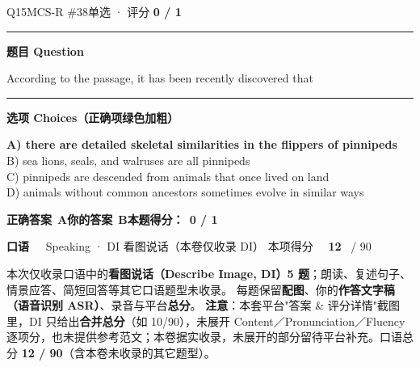 \documentclass[11pt]{article}
\newcommand{\ptesub}[1]{%
  \par\needspace{2\baselineskip}\smallskip
  {\color{cAccent}\rule[-0.2ex]{3pt}{1.05em}}\hspace{6pt}%
  {\bfseries\color{cHead}#1}\par\nopagebreak\smallskip}
\newcommand{\ptesection}[3]{%
  \addcontentsline{toc}{section}{#1}%
  \needspace{6\baselineskip}
  \begin{tcolorbox}[enhanced, colback=cAccent, colframe=cAccent, sharp corners,
     left=14pt, right=14pt, top=10pt, bottom=10pt, boxrule=0pt]
    {\fontsize{20}{24}\selectfont\bfseries\color{white} #1\ \ }%
    {\large\color{white!85} #2}\hfill
    {\large\color{white}本项得分\ \ }{\fontsize{22}{24}\selectfont\bfseries\color{white} #3}%
    \ {\color{white!85}/ 90}
  \end{tcolorbox}}
\begin{document}
\begin{qblock}{Q15\quad MCS-R \#38}{单选 · 评分 \textcolor{cAccent}{\bfseries 0 / 1}}
\ptesub{题目 Question}
\begin{notebox}According to the passage, it has been recently discovered that\end{notebox}
\ptesub{选项 Choices（正确项绿色加粗）}
{\small
{\color{cFix}\textbf{A) there are detailed skeletal similarities in the flippers of pinnipeds}}\\
B) sea lions, seals, and walruses are all pinnipeds\\
C) pinnipeds are descended from animals that once lived on land\\
D) animals without common ancestors sometimes evolve in similar ways}
\par\smallskip
\textbf{正确答案}\ \textcolor{cFix}{\bfseries A}\qquad\textbf{你的答案}\ {\color{cWrong}\bfseries B}\qquad\textbf{本题得分：}\ {\color{cAccent}\bfseries 0 / 1}
\end{qblock}

\clearpage
\ptesection{口语}{Speaking · DI 看图说话（本卷仅收录 DI）}{12}

\vspace{1mm}
{\small\color{gray} 本次仅收录口语中的\textbf{看图说话（Describe Image, DI）5 题}；朗读、复述句子、情景应答、简短回答等其它口语题型未收录。
每题保留\textbf{配图}、你的\textbf{作答文字稿（语音识别 ASR）}、录音与平台\textbf{总分}。
\textbf{注意}：本套平台"答案 \& 评分详情"截图里，DI 只给出\textbf{合并总分}（如 10/90），未展开 Content／Pronunciation／Fluency 逐项分，也未提供参考范文；本卷据实收录，未展开的部分留待平台补充。口语总分 \textbf{12 / 90}（含本卷未收录的其它题型）。}
\vspace{2mm}
\end{document}
